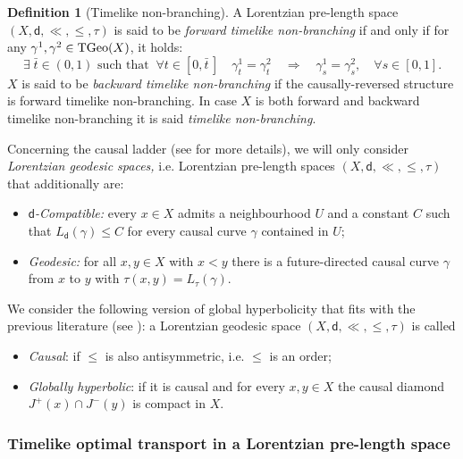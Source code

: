 \documentclass[a4paper,10pt]{article}
\newcommand{\TGeo}{{\rm TGeo}}
\newcommand{\sfd}{\mathsf d}
\theoremstyle{plain}
\theoremstyle{definition}
\newtheorem{definition}[lemma]{Definition}
\numberwithin{equation}{section}
\begin{document}
\begin{definition}[Timelike non-branching]\label{def:TNB}
A  Lorentzian pre-length space $(X,\sfd, \ll, \leq, \tau)$ is said to be \emph{forward timelike non-branching}  if and only if for any $\gamma^{1},\gamma^{2} \in \TGeo(X)$, it holds:
%
$$
\exists \;  \bar t\in (0,1) \text{ such that } \ \forall t \in [0, \bar t\,] \quad  \gamma_{ t}^{1} = \gamma_{t}^{2}   
\quad 
\Longrightarrow 
\quad 
\gamma^{1}_{s} = \gamma^{2}_{s}, \quad \forall s \in [0,1].
$$
$X$ is said to be \emph{backward timelike non-branching} if the causally-reversed structure is forward timelike non-branching. In case $X$ is both forward and backward timelike non-branching it is said \emph{timelike non-branching}.
\end{definition}  
%
Concerning the causal ladder (see \cite{KS,Minguzzi:23} for more details), 
we will only consider \emph{Lorentzian geodesic spaces,} i.e. 
 Lorentzian pre-length spaces $(X,\sfd, \ll, \leq, \tau)$ that  additionally are: 
\begin{itemize}
\item \emph{$\sfd$-Compatible:} every $x\in X$ admits a neighbourhood $U$ and a constant $C$ such that $L_{\sfd}(\gamma)\leq C$ for every causal curve $\gamma$ contained in $U$;
\item  \emph{Geodesic:} for all $x,y\in X$ with $x<y$ there is a future-directed causal curve $\gamma$ from $x$ to $y$ with $\tau(x,y)= L_{\tau}(\gamma)$.
\end{itemize}
%
We consider the following  version of global hyperbolicity that fits with the previous literature (see \cite[Cor.]{Minguzzi:23}): 
a Lorentzian geodesic space $(X,\sfd, \ll, \leq,\tau)$ is called
\begin{itemize}
\item \emph{Causal}: if $\leq$  is also antisymmetric, i.e. $\leq$ is an order; 
\item \emph{Globally hyperbolic}: if it is causal and for every $x,y\in X$ the causal diamond $J^{+}(x)\cap J^{-}(y)$ is compact in $X$.
\end{itemize}
%

\subsubsection{Timelike optimal transport in a Lorentzian pre-length space}
\end{document}
